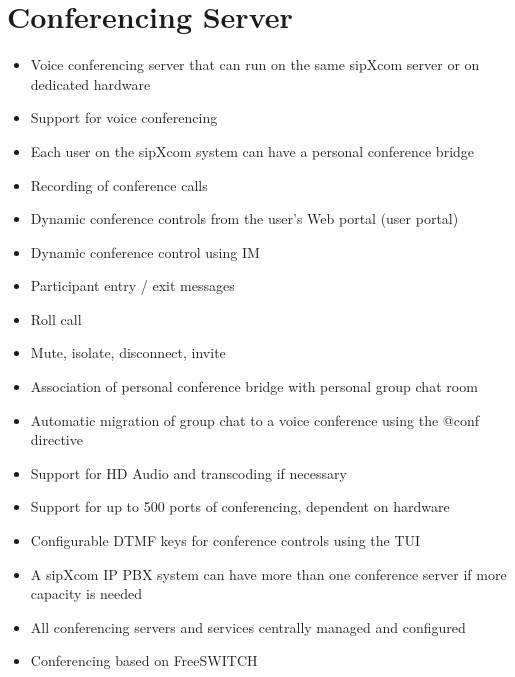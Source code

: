\documentclass[letterpaper,10pt,english]{sphinxmanual}
\begin{document}
\section{Conferencing Server}
\label{\detokenize{features:conferencing-server}}\begin{itemize}
\item {} 
Voice conferencing server that can run on the same sipXcom server or on dedicated hardware

\item {} 
Support for voice conferencing

\item {} 
Each user on the sipXcom system can have a personal conference bridge

\item {} 
Recording of conference calls

\item {} 
Dynamic conference controls from the user’s Web portal (user portal)

\item {} 
Dynamic conference control using IM

\item {} 
Participant entry / exit messages

\item {} 
Roll call

\item {} 
Mute, isolate, disconnect, invite

\item {} 
Association of personal conference bridge with personal group chat room

\item {} 
Automatic migration of group chat to a voice conference using the @conf directive

\item {} 
Support for HD Audio and transcoding if necessary

\item {} 
Support for up to 500 ports of conferencing, dependent on hardware

\item {} 
Configurable DTMF keys for conference controls using the TUI

\item {} 
A sipXcom IP PBX system can have more than one conference server if more capacity is needed

\item {} 
All conferencing servers and services centrally managed and configured

\item {} 
Conferencing based on FreeSWITCH

\end{itemize}
\end{document}
